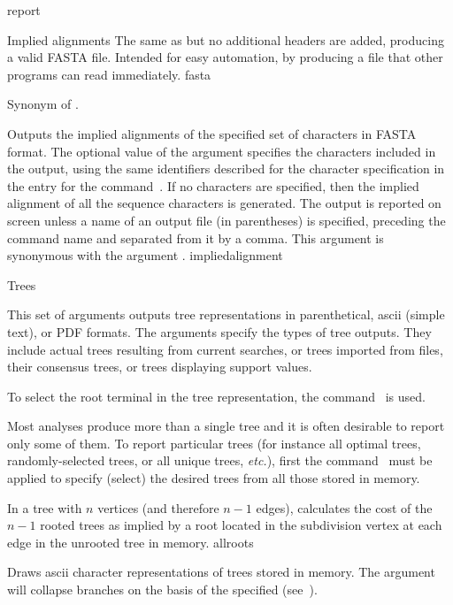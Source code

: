 \begin{command}{report}{}
\begin{arguments}
\begin{argumentgroup}{Implied alignments}
{The same as  
but no additional headers are added, producing a valid FASTA file. 
Intended for easy automation, by producing a file that other programs 
can read immediately.}
{fasta}

{Synonym of .}
{}

{Outputs the implied alignments of the specified
set of characters in FASTA format. The optional value of the
argument specifies the characters included
in the output, using the same identifiers described for the
character specification in the entry for the command~. If no
characters are specified, then the implied alignment of all the
sequence characters is generated. The output is reported on
screen unless a name of an output file (in parentheses) is
specified, preceding the command name and separated from it by a
comma. This argument is synonymous with the argument
.}
{impliedalignment}

\end{argumentgroup}

\begin{argumentgroup}{Trees}
{This set of arguments outputs tree representations
in parenthetical, ascii (simple text), or PDF formats.
The arguments specify the types of tree outputs. They include
actual trees resulting from current searches, or trees imported from
files, their consensus trees, or trees displaying support values.

To select the root terminal in the tree representation, the 
command~ is used.

Most analyses produce more than a single tree and it is
often desirable to report only some of them. To
report particular trees (for instance all optimal trees,
randomly-selected trees, or all unique trees, \emph{etc.}), first the
command~ must be applied to specify (select)
the desired trees from all those stored in memory.} 

{In a tree with $n$ vertices (and therefore $n - 1$ edges),
calculates the cost of the $n - 1$ rooted trees as implied by a
root located in the subdivision vertex at each edge in the unrooted
tree in memory.}
{allroots}

{Draws ascii character representations of trees stored in memory. The
argument  will collapse branches on the basis 
of the \poylident specified (see~). }
{}


\end{argumentgroup}
\end{arguments}
\end{command}
